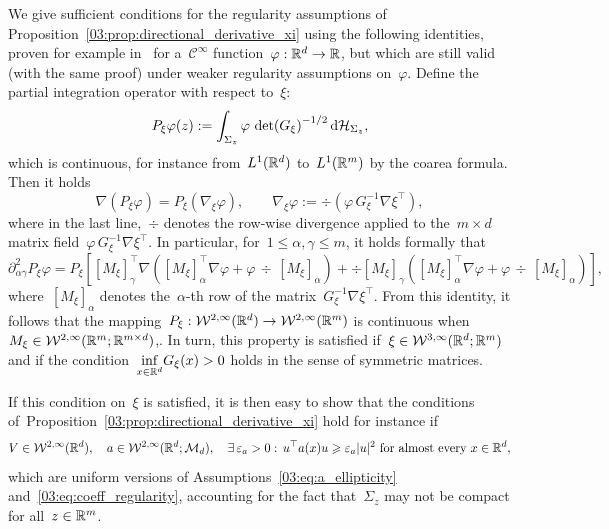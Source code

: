 \label{03:sec:tech_reg}
    We give sufficient conditions for the regularity assumptions of Proposition~\ref{03:prop:directional_derivative_xi} using the following identities, proven for example in~\cite[Lemma 3.10]{LRS10} for a~$\mathcal C^\infty$ function~$\varphi:\mathbb{R}^d\to\mathbb{R}$, but which are still valid (with the same proof) under weaker regularity assumptions on~$\varphi$.
        Define the partial integration operator with respect to~$\xi$:
        \begin{equation}
            P_\xi\varphi(z) := \int_{\Sigma_z} \varphi\,\det(G_\xi)^{-1/2}\,\mathrm{d} \mathcal{H}_{\Sigma_z},
        \end{equation}
        which is continuous, for instance from~$L^1(\mathbb{R}^d)$ to~$L^1(\mathbb{R}^m)$ by the coarea formula. Then it holds
        \begin{equation}
            \nabla \left(P_\xi \varphi\right) = P_\xi \left(\nabla_\xi \varphi\right),\qquad \nabla_\xi\varphi := \div\left(\varphi\,G_\xi^{-1}\nabla\xi^\top\right),
        \end{equation}
        where in the last line,~$\div$ denotes the row-wise divergence applied to the~$m\times d$ matrix field~$\varphi\,G_\xi^{-1}\nabla\xi^\top$.
        In particular, for~$1\leq \alpha,\gamma\leq m$, it holds formally that
        \begin{equation}
            \partial^2_{\alpha\gamma} P_\xi \varphi = P_\xi\left[\left[M_\xi\right]_{\gamma}^\top\nabla\left(\left[M_\xi\right]_{\alpha}^\top \nabla \varphi + \varphi\,\div\,\left[M_\xi\right]_\alpha\right) + \div\left[M_\xi\right]_{\gamma}\left(\left[M_\xi\right]_{\alpha}^\top \nabla \varphi + \varphi\,\div\,\left[M_\xi\right]_\alpha\right)\right],
        \end{equation}
        where~$\left[M_\xi\right]_\alpha$ denotes the~$\alpha$-th row of the matrix~$G_\xi^{-1}\nabla\xi^\top$.
        From this identity, it follows that the mapping~$P_\xi:\mathcal W^{2,\infty}(\mathbb{R}^d)\to \mathcal W^{2,\infty}(\mathbb{R}^m)$ is continuous when~$M_\xi \in \mathcal{W}^{2,\infty}(\mathbb{R}^m;\mathbb{R}^{m\times d})$,.
        In turn, this property is satisfied if~$\xi\in \mathcal{W}^{3,\infty}(\mathbb{R}^d;\mathbb{R}^m)$ and if the condition~$\underset{x\in\mathbb{R}^d}{\inf} G_\xi(x) > 0$ holds in the sense of symmetric matrices.

        If this condition on~$\xi$ is satisfied, it is then easy to show that the conditions of~Proposition~\ref{03:prop:directional_derivative_xi} hold for instance if
        \begin{equation}
            V\in \mathcal{W}^{2,\infty}(\mathbb{R}^d),\quad a\in \mathcal{W}^{2,\infty}(\mathbb{R}^d;\mathcal M_d),\quad \exists\,\varepsilon_a>0:\,u^\top a(x)u\geqslant\varepsilon_a |u|^2\text{ for almost every }x\in\mathbb{R}^d,
        \end{equation}
        which are uniform versions of Assumptions~\eqref{03:eq:a_ellipticity} and~\eqref{03:eq:coeff_regularity}, accounting for the fact that~$\Sigma_z$ may not be compact for all~$z\in \mathbb{R}^m$.

